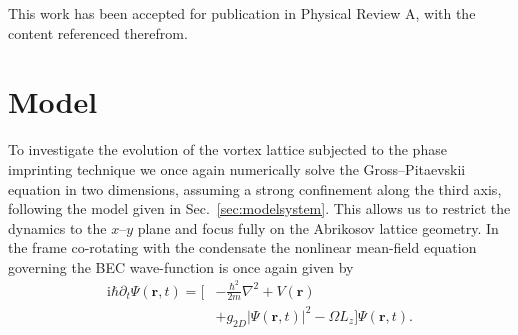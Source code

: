 This work has been accepted for publication in Physical Review A, with the content referenced therefrom.

\section{Model}\label{sec:model}

To investigate the evolution of the vortex lattice subjected to the phase imprinting technique we once again numerically solve the Gross--Pitaevskii equation in two dimensions, assuming a strong confinement along the third axis, following the model given in Sec.~\ref{sec:modelsystem}. This allows us to restrict the dynamics to the $x$--$y$ plane and focus fully on the Abrikosov lattice geometry. In the frame co-rotating with the condensate the nonlinear mean-field equation governing the BEC wave-function is once again given by
\begin{align}
    \textrm{i}\hbar\partial_t \Psi(\mathbf{r},t) = \bigg[&-\frac{\hbar^2}{2m}\nabla^2 + V\left(\mathbf{r}\right) \nonumber\\
	&+ g_{2D}\vert \Psi(\mathbf{r},t) \vert^2- \Omega L_z \bigg]\Psi(\mathbf{r},t).
\end{align}


